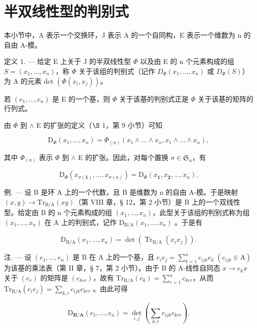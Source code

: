 \section{半双线性型的判别式}

本小节中，A 表示一个交换环，J 表示 A 的一个自同构，E 表示一个维数为 n 的自由 A-模。

定义 1. --- 给定 E 上关于 J 的半双线性型 \(\Phi\) 以及由 E 的 n 个元素构成的组 \(S = (x_1, \ldots, x_n)\)，称 \(\Phi\) 关于该组的判别式（记作 \(D_{\Phi}(x_1, \ldots, x_n)\) 或 \(D_{\Phi}(S)\)）为 A 的元素 det \((\Phi(x_i, x_j))\)。

若 \((e_{1},\ldots,e_{n})\) 是 E 的一个基，则 \(\Phi\) 关于该基的判别式正是 \(\Phi\) 关于该基的矩阵的行列式。

由 \(\Phi\) 到 \(\wedge\) E 的扩张的定义（\(\S\) 1，第 9 小节）可知

\[
\mathrm{D} _ {\Phi} (x _ {1}, \dots , x _ {n}) = \Phi_ {(n)} (x _ {1} \wedge \dots \wedge x _ {n}, x _ {1} \wedge \dots \wedge x _ {n}),\tag{1}
\]

其中 \(\Phi_{(n)}\) 表示 \(\Phi\) 到 \(\wedge\) E 的扩张。因此，对每个置换 \(\sigma \in \mathfrak{S}_n\)，有

\[
\mathrm{D} _ {\Phi} (x _ {\sigma (\mathbf {1})}, \dots , x _ {\sigma (n)}) = \mathrm{D} _ {\Phi} (x _ {\mathbf {1}}, x _ {\mathbf {2}}, \dots , x _ {n}).
\]

例. --- 设 B 是环 A 上的一个代数，且 B 是维数为 n 的自由 A-模。于是映射 \((x, y) \to \mathrm{Tr}_{\mathrm{B}/\mathrm{A}}(xy)\)（第 VIII 章，§ 12，第 2 小节）是 B 上的一个双线性型。给定由 B 的 n 个元素构成的组 \((x_{1}, \ldots, x_{n})\)，此型关于该组的判别式称为组 \((x_{1}, \ldots, x_{n})\) 在 A 上的判别式，记作 \(\mathrm{D}_{\mathrm{B}/\mathrm{A}}(x_{1}, \ldots, x_{n})\) 。于是有

\[
\mathrm{D} _ {\mathrm{B/A}} (x _ {1}, \dots , x _ {n}) = \det (\operatorname{Tr} _ {\mathrm{B/A}} (x _ {i} x _ {j})).\tag{2}
\]

注. --- 设 \((e_{1},\ldots,e_{n})\) 是 B 在 A 上的一个基，且 \(e_{i}e_{j}=\sum_{k=1}^{n}c_{ijk}e_{k}\;(c_{ijk}\in\mathrm{A})\) 为该基的乘法表（第 II 章，§ 7，第 2 小节）。由于 B 的 A-线性自同态 \(x\to e_{k}x\) 关于 \((e_{r})\) 的矩阵是 \((c_{ksr})\)，故有 \(\mathrm{Tr}_{\mathrm{B}/\mathrm{A}}(e_{k})=\sum_{r=1}^{n}c_{krr}\)，从而 \(\mathrm{Tr}_{\mathrm{B}/\mathrm{A}}(e_{i}e_{j})=\sum_{k,r}c_{ijk}c_{krr}\) 。由此可得

\[
\mathrm{D} _ {\mathbf {B} / \mathbf {A}} (e _ {1}, \dots , e _ {n}) = \det _ {i, j} (\sum_ {k, r} c _ {i j k} c _ {k r r}).\tag{3}
\]

